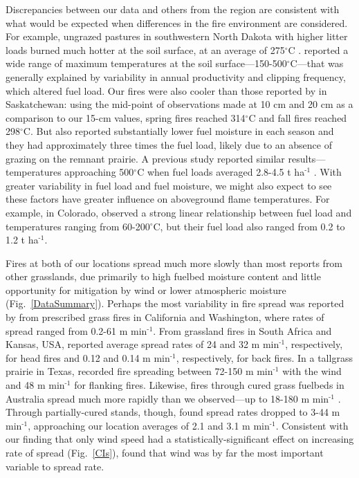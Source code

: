 \documentclass[referee, 
		     sn-basic]{sn-jnl}
\begin{document}
\begin{linenumbers}
Discrepancies between our data and others from the region are consistent with what would be expected when differences in the fire environment are considered. 
For example, ungrazed pastures in southwestern North Dakota with higher litter loads burned much hotter at the soil surface, at an average of 275$^\circ$C \citep{mcgranahan2022}.
\citet{ohrtman2015} reported a wide range of maximum temperatures at the soil surface---150-500\(^\circ\)C---that was generally explained by variability in annual productivity and clipping frequency, which altered fuel load. 
Our fires were also cooler than those reported by \citet{archibold2003} in Saskatchewan: using the mid-point of observations made at 10 cm and 20 cm as a comparison to our
15-cm values, spring fires reached 314\(^\circ\)C and fall fires reached
298\(^\circ\)C. But \citet{archibold2003} also reported substantially
lower fuel moisture in each season and they had approximately three
times the fuel load, likely due to an absence of grazing on the remnant
prairie. A previous study reported similar results---temperatures
approaching 500\(^\circ\)C when fuel loads averaged 2.8-4.5 t
ha\(^{\text{-}1}\) \citep{archibold1998}. 
With greater variability in fuel load and fuel moisture, we might also expect to see these factors have greater influence on aboveground flame temperatures. For example,
in Colorado, \citet{augustine2014} observed a strong linear relationship
between fuel load and temperatures ranging from 60-200\(^\circ\)C, but
their fuel load also ranged from 0.2 to 1.2 t ha\(^{\text{-}1}\).

Fires at both of our locations spread much more slowly than most reports
from other grasslands, due primarily to high fuelbed moisture content
and little opportunity for mitigation by wind or lower atmospheric
moisture (Fig.~\ref{DataSummary}).
Perhaps the most variability in fire spread was 
reported by \citet{sneeuwjagt1977} from prescribed grass fires in
California and Washington, where rates of spread ranged from 0.2-61 m
min\(^{\text{-}1}\). From grassland fires in South Africa and Kansas,
USA, \citet{trollope2002} reported average spread rates of 24 and 32 m
min\(^{\text{-}1}\), respectively, for head fires and 0.12 and 0.14 m
min\(^{\text{-}1}\), respectively, for back fires. In a tallgrass
prairie in Texas, \citet{clements2019} recorded fire spreading between
72-150 m min\(^{\text{-}1}\) with the wind and 48 m min\(^{\text{-}1}\)
for flanking fires. Likewise, fires through cured grass fuelbeds in
Australia spread much more rapidly than we observed---up to 18-180 m
min\(^{\text{-}1}\) \citep{cheney1993, cheney1995, cruz2015}. Through
partially-cured stands, though, \citet{cruz2015} found spread rates
dropped to 3-44 m min\(^{\text{-}1}\), approaching our location averages
of 2.1 and 3.1 m min\(^{\text{-}1}\). 
Consistent with our finding that only wind speed had a statistically-significant effect on increasing
rate of spread (Fig.~\ref{CIs}), \citet{cheney1993} found that wind was by far
the most important variable to spread rate.


\end{linenumbers}
\end{document}
